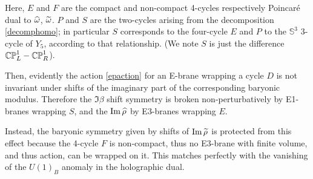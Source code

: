 Here, $E$ and $F$ are the compact and non-compact 4-cycles respectively Poincar\'e dual to $\widehat{\omega}$, $\widetilde{\omega}$. $P$ and $S$ are the two-cycles arising from the decomposition \eqref{decomphomo}; in particular $S$ corresponds to the four-cycle $E$ and $P$ to the $\mathbb{S}^3$ 3-cycle of $Y_5$, according to that relationship. (We note $S$ is just the difference $\mathbb{CP}^1_L - \mathbb{CP}^1_R$).

Then, evidently the action \eqref{epaction} for an E-brane wrapping a cycle $D$ is not invariant under shifts of the imaginary part of the corresponding baryonic modulus. Therefore the $\Im\beta$ shift symmetry is broken non-perturbatively by E1-branes wrapping $S$, and the $\operatorname{Im}\widehat{\rho}$ by E3-branes wrapping $E$.

Instead, the baryonic symmetry given by shifts of $\operatorname{Im}\widetilde{\rho}$ is protected from this effect because the 4-cycle $F$ is non-compact, thus no E3-brane with finite volume, and thus action, can be wrapped on it. This matches perfectly with the vanishing of the $U(1)_B$ anomaly in the holographic dual.

